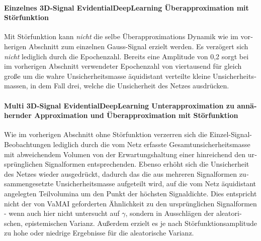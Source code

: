 \begin{otherlanguage}{ngerman}
\paragraph{Einzelnes 3D-Signal \gls{EvidentialDeepLearning} Überapproximation mit Störfunktion}

Mit Störfunktion kann \textit{nicht} die selbe Überapproximations Dynamik wie im vorherigen Abschnitt zum einzelnen Gauss-Signal erzielt werden. Es verzögert sich \textit{nicht} lediglich durch die Epochenzahl. Bereits eine Amplitude von 0,2 sorgt bei im vorherigen Abschnitt verwendeter Epochenzahl von viertausend für gleich große um die wahre Unsicherheitsmasse äquidistant verteilte kleine Unsicherheitsmassen, in dem Fall drei, welche die Unsicherheit des Netzes ausdrücken. 



\paragraph{Multi 3D-Signal \gls{EvidentialDeepLearning} Unterapproximation zu annähernder Approximation und Überapproximation mit Störfunktion} 

Wie im vorherigen Abschnitt ohne Störfunktion verzerren sich die Einzel-Signal-Beobachtungen lediglich durch die vom Netz erfasste Gesamtunsicherheitsmasse mit abweichendem Volumen von der Erwartungshaltung einer hinreichend den ursprünglichen Signalformen entsprechenden. Ebenso erhöht sich die Unsicherheit des Netzes wieder ausgedrückt, dadurch das die aus mehreren Signalformen zusammengesetzte Unsicherheitsmasse aufgeteilt wird, auf die vom Netz äquidistant angelegten Teilvolumina um den Punkt der höchsten Signaldichte. Dies entspricht nicht der von VaMAI geforderten Ähnlichkeit zu den ursprünglichen Signalformen - wenn auch hier nicht untersucht auf $\gamma$, sondern in Ausschlägen der aleatorischen, epistemischen Varianz. Außerdem erzielt es je nach Störfunktionsamplitude zu hohe oder niedrige Ergebnisse für die aleatorische Varianz. 




\end{otherlanguage}

